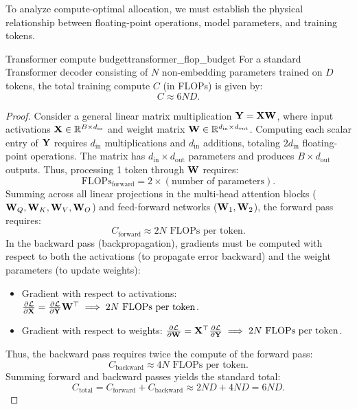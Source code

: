\documentclass[../../main.tex]{subfiles}
\begin{document}
To analyze compute-optimal allocation, we must establish the physical relationship between floating-point operations, model parameters, and training tokens.

\begin{theorem}{Transformer compute budget}{transformer_flop_budget}
For a standard Transformer decoder consisting of $N$ non-embedding parameters trained on $D$ tokens, the total training compute $C$ (in FLOPs) is given by:
\begin{equation}
\label{eq:6nd_formulation}
C \approx 6 N D.
\end{equation}
\end{theorem}

\begin{proof}
Consider a general linear matrix multiplication $\mathbf{Y} = \mathbf{X} \mathbf{W}$, where input activations $\mathbf{X} \in \mathbb{R}^{B \times d_{\text{in}}}$ and weight matrix $\mathbf{W} \in \mathbb{R}^{d_{\text{in}} \times d_{\text{out}}}$. 
Computing each scalar entry of $\mathbf{Y}$ requires $d_{\text{in}}$ multiplications and $d_{\text{in}}$ additions, totaling $2 d_{\text{in}}$ floating-point operations. The matrix has $d_{\text{in}} \times d_{\text{out}}$ parameters and produces $B \times d_{\text{out}}$ outputs. Thus, processing 1 token through $\mathbf{W}$ requires:
\begin{equation}
\text{FLOPs}_{\text{forward}} = 2 \times (\text{number of parameters}).
\end{equation}
Summing across all linear projections in the multi-head attention blocks ($\mathbf{W}_Q, \mathbf{W}_K, \mathbf{W}_V, \mathbf{W}_O$) and feed-forward networks ($\mathbf{W}_1, \mathbf{W}_2$), the forward pass requires:
\begin{equation}
C_{\text{forward}} \approx 2 N \text{ FLOPs per token}.
\end{equation}
In the backward pass (backpropagation), gradients must be computed with respect to both the activations (to propagate error backward) and the weight parameters (to update weights):
\begin{itemize}
    \item Gradient with respect to activations: $\frac{\partial \mathcal{L}}{\partial \mathbf{X}} = \frac{\partial \mathcal{L}}{\partial \mathbf{Y}} \mathbf{W}^\top \implies 2 N \text{ FLOPs per token}$.
    \item Gradient with respect to weights: $\frac{\partial \mathcal{L}}{\partial \mathbf{W}} = \mathbf{X}^\top \frac{\partial \mathcal{L}}{\partial \mathbf{Y}} \implies 2 N \text{ FLOPs per token}$.
\end{itemize}
Thus, the backward pass requires twice the compute of the forward pass:
\begin{equation}
C_{\text{backward}} \approx 4 N \text{ FLOPs per token}.
\end{equation}
Summing forward and backward passes yields the standard total:
\begin{equation}
C_{\text{total}} = C_{\text{forward}} + C_{\text{backward}} \approx 2 N D + 4 N D = 6 N D.
\end{equation}
\end{proof}
\end{document}
